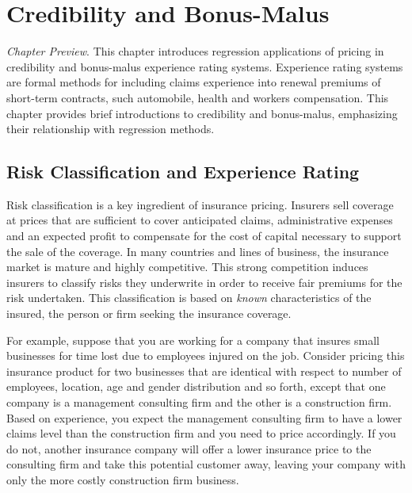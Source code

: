 \setcounter{chapter}{17}

\chapter{Credibility and Bonus-Malus}


{\small \textit{Chapter Preview}. This chapter introduces regression
applications of pricing in credibility and bonus-malus experience
rating systems. Experience rating systems are formal methods for
including claims experience into renewal premiums of short-term
contracts, such automobile, health and workers compensation. This
chapter provides brief introductions to credibility and bonus-malus,
emphasizing their relationship with regression methods.}

\section{Risk Classification and Experience Rating}


Risk classification is a key ingredient of insurance pricing.
Insurers sell coverage at prices that are sufficient to cover
anticipated claims, administrative expenses and an expected profit
to compensate for the cost of capital necessary to support the sale
of the coverage. In many countries and lines of business, the
insurance market is mature and highly competitive. This strong
competition induces insurers to classify risks they underwrite in
order to receive fair premiums for the risk undertaken. This
classification is based on \emph{known} characteristics of the
insured, the person or firm seeking the insurance coverage.


For example, suppose that you are working for a company that insures
small businesses for time lost due to employees injured on the job.
Consider pricing this insurance product for two businesses that are
identical with respect to number of employees, location, age and
gender distribution and so forth, except that one company is a
management consulting firm and the other is a construction firm.
Based on experience, you expect the management consulting firm to
have a lower claims level than the construction firm and you need to
price accordingly. If you do not, another insurance company will
offer a lower insurance price to the consulting firm and take this
potential customer away, leaving your company with only the more
costly construction firm business.

